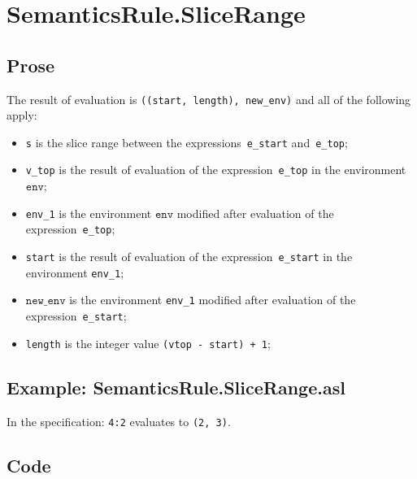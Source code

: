\documentclass{book}
\newcommand\newenv[0]{\texttt{new\_env}}
\newcommand\env[0]{\texttt{env}}
\begin{document}

\section{SemanticsRule.SliceRange \label{sec:SemanticsRule.SliceRange}}

  \subsection{Prose}
  The result of evaluation is \texttt{((start, length), new\_env)} and all of the following apply:
  \begin{itemize}
    \item \texttt{s} is the slice range between the
      expressions~\texttt{e\_start} and~\texttt{e\_top};
    \item \texttt{v\_top} is the result of evaluation of the
      expression~\texttt{e\_top} in the environment $\env$;
    \item \texttt{env\_1} is the environment $\env$ modified after
      evaluation of the expression~\texttt{e\_top};
    \item \texttt{start} is the result of evaluation of the
      expression~\texttt{e\_start} in the environment \texttt{env\_1};
    \item $\newenv$ is the environment \texttt{env\_1} modified after
      evaluation of the expression~\texttt{e\_start};
    \item \texttt{length} is the integer value \texttt{(vtop - start) + 1};
  \end{itemize}

  \subsection{Example: SemanticsRule.SliceRange.asl}
  In the specification:
  \texttt{4:2} evaluates to \texttt{(2, 3)}.

  \subsection{Code}
\end{document}
